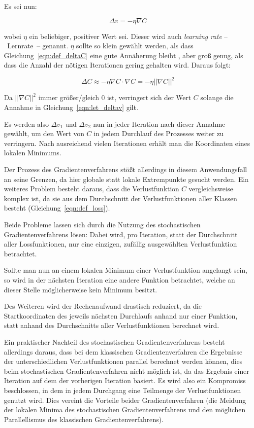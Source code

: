 Es sei nun:

\begin{equation}
\label{eqn:let_deltav}
\Delta v = -\eta\nabla C
\end{equation}

wobei $\eta$ ein beliebiger, positiver Wert sei. Dieser wird auch \textit{learning rate} --~Lernrate~-- genannt. $\eta$ sollte so klein gewählt werden, als dass Gleichung~\ref{eqn:def_deltaC} eine gute Annäherung bleibt \cite[Kap.~1]{nielsen_15}, aber groß genug, als dass die Anzahl der nötigen Iterationen gering gehalten wird. Daraus folgt:

\begin{equation}
\Delta C\approx -\eta\nabla C\cdot\nabla C= -\eta\left|\left|\nabla C\right| \right|^2
\end{equation}

Da $\left|\left|\nabla C\right| \right|^2$ immer größer/gleich 0 ist, verringert sich der Wert $C$ solange die Annahme in Gleichung~\ref{eqn:let_deltav} gilt. 

Es werden also $\Delta v_1$ und $\Delta v_2$ nun in jeder Iteration nach dieser Annahme gewählt, um den Wert von $C$ in jedem Durchlauf des Prozesses weiter zu verringern. Nach ausreichend vielen Iterationen erhält man die Koordinaten eines lokalen Minimums.

Der Prozess des Gradientenverfahrens stößt allerdings in diesem Anwendungsfall an seine Grenzen, da hier globale statt lokale Extrempunkte gesucht werden. Ein weiteres Problem besteht daraus, dass die Verlustfunktion $C$ vergleichsweise komplex ist, da sie aus dem Durchschnitt der Verlustfunktionen aller Klassen besteht (\vgl Gleichung~\ref{eqn:def_loss}).

Beide Probleme lassen sich durch die Nutzung des stochastischen Gradientenverfahrens lösen: Dabei wird, pro Iteration, statt der Durchschnitt aller Lossfunktionen, nur eine einzigen, zufällig ausgewählten Verlustfunktion betrachtet. \cite{kathuria_18}

Sollte man nun an einem lokalen Minimum einer Verlustfunktion angelangt sein, so wird in der nächsten Iteration eine andere Funktion betrachtet, welche an dieser Stelle möglicherweise kein Minimum besitzt.

Des Weiteren wird der Rechenaufwand drastisch reduziert, da die Startkoordinaten des jeweils nächsten Durchlaufs anhand nur einer Funktion, statt anhand des Durchschnitts aller Verlustfunktionen berechnet wird.

Ein praktischer Nachteil des stochastischen Gradientenverfahrens besteht allerdings daraus, dass bei dem klassischen Gradientenverfahren die Ergebnisse der unterschiedlichen Verlustfunktionen parallel berechnet werden können, dies beim stochastischen Gradientenverfahren nicht möglich ist, da das Ergebnis einer Iteration auf dem der vorherigen Iteration basiert. Es wird also ein Kompromiss beschlossen, in dem in jedem Durchgang eine Teilmenge der Verlustfunktionen genutzt wird. \cite{kathuria_18} Dies vereint die Vorteile beider Gradientenverfahren (die Meidung der lokalen Minima des stochastischen Gradientenverfahrens und den möglichen Parallellismus des klassischen Gradientenverfahrens).

